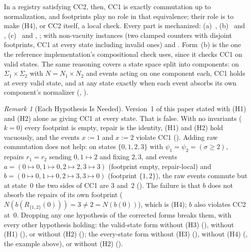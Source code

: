\documentclass[11pt,a4paper]{article}
\theoremstyle{plain}
\theoremstyle{definition}
\theoremstyle{remark}
\newtheorem{remark}[theorem]{Remark}
\renewcommand{\_}{\textunderscore\allowbreak}
\begin{document}
In a registry satisfying CC2, then, CC1 is exactly commutation up to
normalization, and footprints play no role in that equivalence; their role is
to make (H4), or CC2 itself, a local check.  Every part is mechanized:
(a)~, (b)~
and , (c)~ and
, 
; with non-vacuity instances
 (two clamped counters with disjoint footprints, CC1
at every state including invalid ones) and .  Form~(b) is
the one the reference implementation's compositional check uses, since it
checks CC1 on valid states.  The same reasoning covers a state space split
into components: on $\Sigma_1 \times \Sigma_2$ with $N = N_1 \times N_2$ and
events acting on one component each, CC1 holds at every valid state, and at
any state exactly when each event absorbs its own component's normalizer
(, ).

\begin{remark}[Each Hypothesis Is Needed]
\label{rem:footprint-counterexamples}
Version~1 of this paper stated  with (H1) and (H2)
alone as giving CC1 at every state.  That is false.  With no invariants
($k = 0$) every footprint is empty, repair is the identity, (H1) and (H2) hold
vacuously, and the events $x := 1$ and $x := 2$ violate CC1
().  Adding raw commutation does not
help: on states $\{0,1,2,3\}$ with $\psi_1 = \psi_2 = (\sigma \geq 2)$,
repairs $r_1 = r_2$ sending $0, 1 \mapsto 2$ and fixing $2, 3$, and events
$a = (0 \mapsto 0, 1 \mapsto 0, 2 \mapsto 2, 3 \mapsto 3)$ (footprint empty,
repair-local) and $b = (0 \mapsto 0, 1 \mapsto 0, 2 \mapsto 3, 3 \mapsto 0)$
(footprint $\{1, 2\}$), the raw events commute but at state~$0$ the two sides
of CC1 are $3$ and~$2$ ().  The
failure is that $b$ does not absorb the repairs of its own footprint
($N(b(R_{\{1,2\}}(0))) = 3 \neq 2 = N(b(0))$), which is (H4); $b$ also
violates CC2 at~$0$.  Dropping any one hypothesis of the corrected forms
breaks them, with every other hypothesis holding: the valid-state form
without (H3) (), without (H1)
(), or without (H2)
(); the every-state form without (H3)
(), without (H4)
(, the example above), or without (H2)
().
\end{remark}
\end{document}
